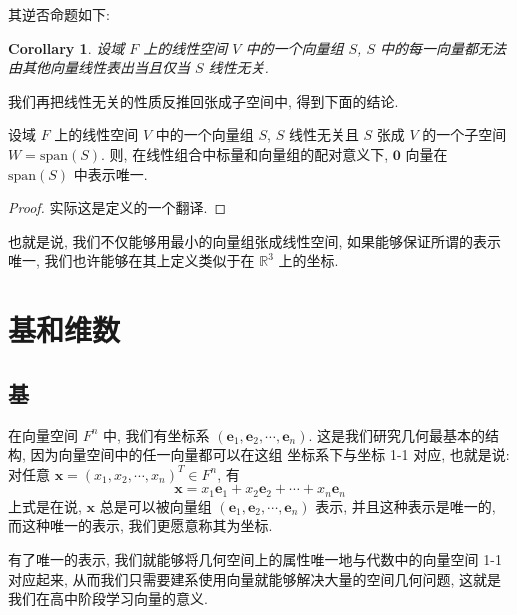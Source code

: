 \documentclass[UTF8]{book}
\newtheorem{corollary}{Corollary}[section]
\begin{document}
其逆否命题如下: 
\begin{corollary}
    设域 $F$ 上的线性空间 $V$ 中的一个向量组 $S$, 
    $S$ 中的每一向量都无法由其他向量线性表出当且仅当 $S$ 线性无关. 
\end{corollary}

我们再把线性无关的性质反推回张成子空间中, 得到下面的结论. 

\begin{proposition}
    设域 $F$ 上的线性空间 $V$ 中的一个向量组 $S$, 
    $S$ 线性无关且 $S$ 张成 $V$ 的一个子空间 
    $W = \mathrm{span}(S)$. 
    则, 在线性组合中标量和向量组的配对意义下, 
    $\boldsymbol{0}$ 向量在 $\mathrm{span}(S)$ 中表示唯一. 
\end{proposition}

\begin{proof}
    实际这是定义的一个翻译. 
\end{proof}

也就是说, 我们不仅能够用最小的向量组张成线性空间, 
如果能够保证所谓的表示唯一, 我们也许能够在其上定义类似于在 
$\mathbb{R}^3$ 上的坐标. 

\section{基和维数}

\subsection{基}

在向量空间 $F^n$ 中, 我们有坐标系 
$(\boldsymbol{e}_1,\boldsymbol{e}_2,\cdots,\boldsymbol{e}_n)$. 
这是我们研究几何最基本的结构, 因为向量空间中的任一向量都可以在这组
坐标系下与坐标 1-1 对应, 也就是说: 对任意 
$\boldsymbol{x}=(x_1,x_2,\cdots,x_n)^T\in F^n$, 有 
\begin{equation}
    \boldsymbol{x} = x_1 \boldsymbol{e}_1 + x_2 \boldsymbol{e}_2 + 
    \cdots + x_n \boldsymbol{e}_n
\end{equation}
上式是在说, $\boldsymbol{x}$ 总是可以被向量组 
$(\boldsymbol{e}_1,\boldsymbol{e}_2,\cdots,\boldsymbol{e}_n)$ 
表示, 并且这种表示是唯一的, 而这种唯一的表示, 我们更愿意称其为坐标. 

有了唯一的表示, 我们就能够将几何空间上的属性唯一地与代数中的向量空间 
1-1 对应起来, 从而我们只需要建系使用向量就能够解决大量的空间几何问题, 
这就是我们在高中阶段学习向量的意义. 
\end{document}
